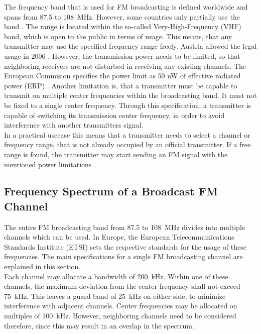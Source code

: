 The frequency band that is used for FM broadcasting is defined worldwide and spans from 87.5 to 108~MHz.
However, some countries only partially use the band \cite[RR5-39]{ItuRadioRegulations}.
The range is located within the so-called Very-High-Frequency (VHF) band, which is open to the public in terms of usage.
This means, that any transmitter may use the specified frequency range freely.
Austria allowed the legal usage in 2006 \cite{AustriaRundfunkgesetz2014}.
However, the transmission power needs to be limited, so that neighboring receivers are not disturbed in receiving any existing channels.
The European Commision specifies the power limit as 50 nW of effective radiated power (ERP) \cite{EuCommissionRadioSpectrumHarmonization}.
Another limitation is, that a transmitter must be capable to transmit on multiple center frequencies within the broadcasting band.
It must not be fixed to a single center frequency.
Through this specification, a transmitter is capable of switching its transmission center frequency, in order to avoid interference with another transmitters signal.\\

In a practical usecase this means that a transmitter needs to select a channel or frequency range, that is not already occupied by an official transmitter.
If a free range is found, the transmitter may start sending an FM signal with the mentioned power limitations \cite{EbuFmRegulators}.



\subsection{Frequency Spectrum of a Broadcast FM Channel}
\label{sec:FrequencySpectrumOfABroadcastFmChannel}

The entire FM broadcasting band from 87.5 to 108~MHz divides into multiple channels which can be used.
In Europe, the European Telecommunications Standards Institute (ETSI) sets the respective standards for the usage of these frequencies.
The main specifications for a single FM broadcasting channel are explained in this section.\\

Each channel may allocate a bandwidth of 200~kHz.
Within one of these channels, the maximum deviation from the center frequency shall not exceed 75~kHz.
This leaves a guard band of 25~kHz on either side, to minimize interference with adjacent channels.
Center frequencies may be allocated on multiples of 100~kHz.
However, neighboring channels need to be considered therefore, since this may result in an overlap in the spectrum.\\

